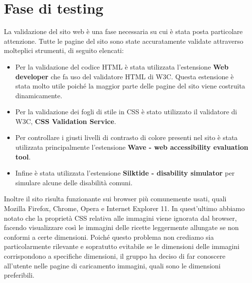 \section{Fase di testing}\label{sec:fase_di_testing}
La validazione del sito web è una fase necessaria su cui è stata posta particolare attenzione. Tutte le pagine del sito sono state accuratamente validate attraverso molteplici strumenti, di seguito elencati:
\begin{itemize}
    \item Per la validazione del codice HTML è stata utilizzata l'estensione \textbf{Web developer} che fa uso del validatore HTML di W3C. Questa estensione è stata molto utile poiché la maggior parte delle pagine del sito viene costruita dinamicamente.
    \item Per la validazione dei fogli di stile in CSS è stato utilizzato il validatore di W3C, \textbf{CSS Validation Service}.
    \item Per controllare i giusti livelli di contrasto di colore presenti nel sito è stata utilizzata principalmente l'estensione \textbf{Wave - web accessibility evaluation tool}.
    \item Infine è stata utilizzata l'estensione \textbf{Silktide - disability simulator} per simulare alcune delle disabilità comuni.
\end{itemize}
Inoltre il sito risulta funzionante sui browser più comunemente usati, quali Mozilla Firefox, Chrome, Opera e Internet Explorer 11. In quest'ultimo abbiamo notato che la proprietà CSS  relativa alle immagini viene ignorata dal browser, facendo visualizzare così le immagini delle ricette leggermente allungate se non conformi a certe dimensioni. Poiché questo problema non crediamo sia particolarmente rilevante e sopratutto evitabile se le dimensioni delle immagini corrispondono a specifiche dimensioni, il gruppo ha deciso di far conoscere all'utente nelle pagine di caricamento immagini, quali sono le dimensioni preferibili.
